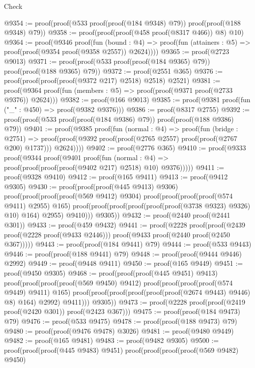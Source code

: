 \begin{lexlean}{Check}
\begin{coremodule}
@9354 := proof(proof(@533 proof(proof(@184 @9348) @79)) proof(proof(@188 @9348) @79))
@9358 := proof(proof(proof(@458 proof(@8317 @466)) @8) @10)
@9364 := proof(@9346
      proof(fun (bound : @4) =>
        proof(fun (attainers : @5) => proof(proof(@9354 proof(@9358 @2557)) @2624))))
@9365 := proof(@2723 @9013)
@9371 := proof(proof(@533 proof(proof(@184 @9365) @79)) proof(proof(@188 @9365) @79))
@9372 := proof(@2551 @365)
@9376 := proof(proof(proof(proof(@9372 @217) @2518) @2518) @2521)
@9381 := proof(@9364 proof(fun (members : @5) => proof(proof(@9371 proof(@2733 @9376)) @2624)))
@9382 := proof(@166 @9013)
@9385 := proof(@9381 proof(fun ("_" : @450) => proof(@9382 @9376)))
@9386 := proof(@8317 @2755)
@9392 := proof(proof(@533 proof(proof(@184 @9386) @79)) proof(proof(@188 @9386) @79))
@9401 := proof(@9385
      proof(fun (normal : @4) =>
        proof(fun (bridge : @2751) =>
          proof(proof(@9392 proof(proof(@2765 @2557) proof(proof(@2767 @200) @1737))) @2624))))
@9402 := proof(@2776 @365)
@9410 := proof(@9333
      proof(@9344
          proof(@9401
              proof(fun (normal : @4) => proof(proof(proof(proof(@9402 @217) @2518) @10) @9376)))))
@9411 := proof(@9328 @9410)
@9412 := proof(@165 @9411)
@9413 := proof(@9412 @9305)
@9430 := proof(proof(proof(@445 @9413) @9306)
      proof(proof(proof(proof(@569 @9412) @9304)
            proof(proof(proof(proof(@574 @9411) @2955) @165)
                proof(proof(proof(proof(proof(proof(@3738 @9323) @9326) @10) @164) @2955) @9410)))
          @9305))
@9432 := proof(@2440 proof(@2441 @301))
@9433 := proof(@459 @9432)
@9441 := proof(@2228
      proof(proof(@2439 proof(@2228 proof(@9433 @2446)))
          proof(@9433 proof(@2440 proof(@2450 @367)))))
@9443 := proof(proof(@184 @9441) @79)
@9444 := proof(@533 @9443)
@9446 := proof(proof(@188 @9441) @79)
@9448 := proof(proof(@9444 @9446) @2992)
@9449 := proof(@9448 @9411)
@9450 := proof(@165 @9449)
@9451 := proof(@9450 @9305)
@9468 := proof(proof(proof(@445 @9451) @9413)
      proof(proof(proof(proof(@569 @9450) @9412)
            proof(proof(proof(proof(@574 @9449) @9411) @165)
                proof(proof(proof(proof(proof(proof(@2674 @9443) @9446) @8) @164) @2992) @9411)))
          @9305))
@9473 := proof(@2228 proof(proof(@2419 proof(@2420 @301)) proof(@2423 @367)))
@9475 := proof(proof(@184 @9473) @79)
@9476 := proof(@533 @9475)
@9478 := proof(proof(@188 @9473) @79)
@9480 := proof(proof(@9476 @9478) @3026)
@9481 := proof(@9480 @9449)
@9482 := proof(@165 @9481)
@9483 := proof(@9482 @9305)
@9500 := proof(proof(proof(@445 @9483) @9451)
      proof(proof(proof(proof(@569 @9482) @9450)

\end{coremodule}
\end{lexlean}
